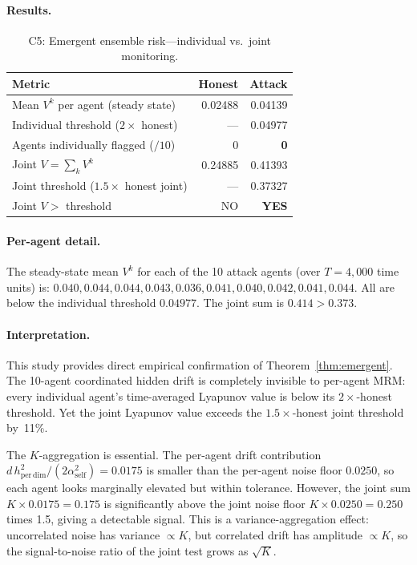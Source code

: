 \documentclass[12pt]{article}
\theoremstyle{plain}
\theoremstyle{definition}
\begin{document}
\paragraph{Results.}

\begin{table}[H]
\centering
\caption{C5: Emergent ensemble risk---individual vs.\ joint monitoring.}
\label{tab:c5}
\begin{tabular}{lrr}
\toprule
Metric & Honest & Attack \\
\midrule
Mean $V^k$ per agent (steady state) & 0.02488 & 0.04139 \\
Individual threshold ($2\times$ honest) & --- & 0.04977 \\
Agents individually flagged ($/ 10$) & 0 & \textbf{0} \\
Joint $V = \sum_k V^k$ & 0.24885 & 0.41393 \\
Joint threshold ($1.5\times$ honest joint) & --- & 0.37327 \\
Joint $V > $ threshold & NO & \textbf{YES} \\
\bottomrule
\end{tabular}
\end{table}

\paragraph{Per-agent detail.}
The steady-state mean $V^k$ for each of the 10 attack agents
(over $T = 4{,}000$ time units) is:
$0.040, 0.044, 0.044, 0.043, 0.036, 0.041, 0.040, 0.042, 0.041, 0.044$.
All are below the individual threshold $0.04977$.  The joint sum is
$0.414 > 0.373$.

\paragraph{Interpretation.}
This study provides direct empirical confirmation of
Theorem~\ref{thm:emergent}.  The 10-agent coordinated hidden drift is
completely invisible to per-agent MRM: every individual agent's time-averaged
Lyapunov value is below its $2\times$-honest threshold.  Yet the joint
Lyapunov value exceeds the $1.5\times$-honest joint threshold by~11\%.

The $K$-aggregation is essential.  The per-agent drift contribution
$d\,h_{\mathrm{per\,dim}}^2/(2\alpha_{\mathrm{self}}^2) = 0.0175$ is
smaller than the per-agent noise floor $0.0250$, so each agent looks
marginally elevated but within tolerance.  However, the joint sum
$K \times 0.0175 = 0.175$ is significantly above the joint noise
floor $K \times 0.0250 = 0.250$ times 1.5, giving a detectable signal.
This is a variance-aggregation effect: uncorrelated noise has variance
$\propto K$, but correlated drift has amplitude $\propto K$, so the
signal-to-noise ratio of the joint test grows as $\sqrt{K}$.
\end{document}

